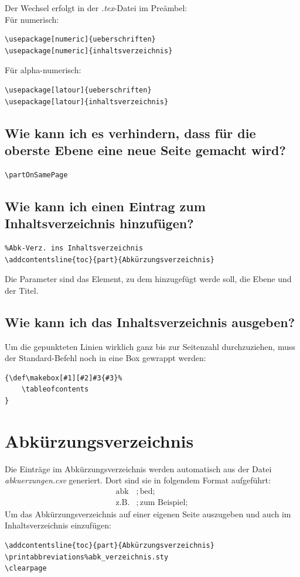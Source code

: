 \documentclass[12pt]{article}
\begin{document}
Der Wechsel erfolgt in der \textit{.tex}-Datei im Preämbel:\\[6pt]
Für numerisch:
\begin{verbatim}
\usepackage[numeric]{ueberschriften}
\usepackage[numeric]{inhaltsverzeichnis}
\end{verbatim}
Für alpha-numerisch:
\begin{verbatim}
\usepackage[latour]{ueberschriften}
\usepackage[latour]{inhaltsverzeichnis}
\end{verbatim}

\subsection{Wie kann ich es verhindern, dass für die oberste Ebene eine neue Seite gemacht wird?}
\begin{verbatim}
\partOnSamePage
\end{verbatim}

\subsection{Wie kann ich einen Eintrag zum Inhaltsverzeichnis hinzufügen?}
\begin{verbatim}
%Abk-Verz. ins Inhaltsverzeichnis
\addcontentsline{toc}{part}{Abkürzungsverzeichnis}
\end{verbatim}
Die Parameter sind das Element, zu dem hinzugefügt werde soll, die Ebene und der Titel.

\subsection{Wie kann ich das Inhaltsverzeichnis ausgeben?}
Um die gepunkteten Linien wirklich ganz bis zur Seitenzahl durchzuziehen, muss der Standard-Befehl noch in eine Box gewrappt werden:
\begin{verbatim}
{\def\makebox[#1][#2]#3{#3}%
	\tableofcontents
}
\end{verbatim}

\section{Abkürzungsverzeichnis}
Die Einträge im Abkürzungsverzeichnis werden automatisch aus der Datei \textit{abkuerzungen.csv} generiert. Dort sind sie in folgendem Format aufgeführt:
\begin{align*}
\text{abk}&;\text{bed};\\
\text{z.B.} &;\text{zum Beispiel};
\end{align*}
\noindent Um das Abkürzungsverzeichnis auf einer eigenen Seite auszugeben und auch im Inhaltsverzeichnis einzufügen:
\begin{verbatim}
\addcontentsline{toc}{part}{Abkürzungsverzeichnis}
\printabbreviations%abk_verzeichnis.sty
\clearpage
\end{verbatim}
\end{document}
